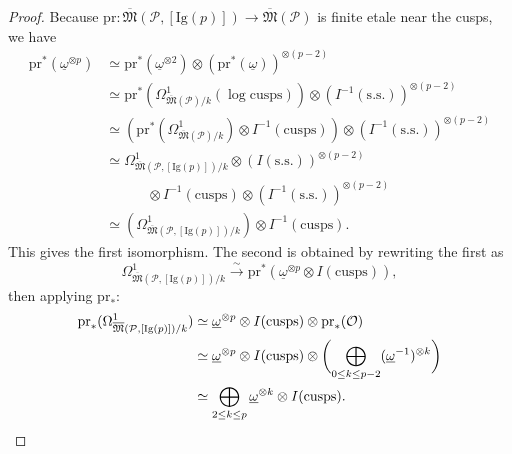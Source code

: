 \begin{proof}
Because $\mathrm{pr} : \overline{\mathfrak{M}}(\mathcal{P}, [\mathrm{Ig}(p)]) \to \overline{\mathfrak{M}}(\mathcal{P})$ is finite etale near the cusps, we have
\begin{align*}
\mathrm{pr}^*(\underline{\omega}^{\otimes p}) &\simeq \mathrm{pr}^*(\underline{\omega}^{\otimes 2}) \otimes (\mathrm{pr}^*(\underline{\omega}))^{\otimes(p-2)} \\
&\simeq \mathrm{pr}^*(\Omega^1_{\overline{\mathfrak{M}}(\mathcal{P})/k}(\log\mathrm{cusps})) \otimes (I^{-1}(\mathrm{s.s.}))^{\otimes(p-2)} \\
&\simeq (\mathrm{pr}^*(\Omega^1_{\overline{\mathfrak{M}}(\mathcal{P})/k}) \otimes I^{-1}(\mathrm{cusps})) \otimes (I^{-1}(\mathrm{s.s.}))^{\otimes(p-2)} \\
&\simeq \Omega^1_{\overline{\mathfrak{M}}(\mathcal{P}, [\mathrm{Ig}(p)])/k} \otimes (I(\mathrm{s.s.}))^{\otimes(p-2)} \\
&\quad\qquad {}\otimes I^{-1}(\mathrm{cusps}) \otimes (I^{-1}(\mathrm{s.s.}))^{\otimes(p-2)} \\
&\simeq (\Omega^1_{\overline{\mathfrak{M}}(\mathcal{P}, [\mathrm{Ig}(p)])/k}) \otimes I^{-1}(\mathrm{cusps}) .
\end{align*}
This gives the first isomorphism. The second is obtained by rewriting the first as
\[
\Omega^1_{\overline{\mathfrak{M}}(\mathcal{P}, [\mathrm{Ig}(p)])/k} \xrightarrow{\ \sim\ } \mathrm{pr}^*(\underline{\omega}^{\otimes p} \otimes I(\mathrm{cusps})) ,
\]
then applying $\mathrm{pr}_*$:
\begin{align*}
\mathrm{pr}_*(\Omega^1_{\overline{\mathfrak{M}}(\mathcal{P}, [\mathrm{Ig}(p)])/k}) &\simeq \underline{\omega}^{\otimes p} \otimes I(\mathrm{cusps}) \otimes \mathrm{pr}_*(\mathcal{O}) \\
&\simeq \underline{\omega}^{\otimes p} \otimes I(\mathrm{cusps}) \otimes \biggl( \bigoplus_{0 \le k \le p-2} (\underline{\omega}^{-1})^{\otimes k} \biggr) \\
&\simeq \bigoplus_{2 \le k \le p} \underline{\omega}^{\otimes k} \otimes I(\mathrm{cusps}) . \qedhere
\end{align*}
\end{proof}

